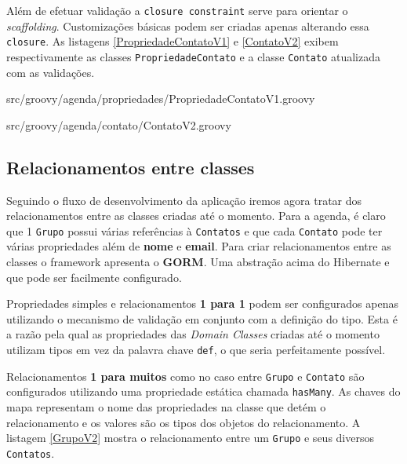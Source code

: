 \documentclass[12pt]{article}
\begin{document}
  Além de efetuar validação a \texttt{closure constraint} serve para orientar o \emph{scaffolding}.
  Customizações básicas podem ser criadas apenas alterando essa \texttt{closure}. As listagens
  \ref{PropriedadeContatoV1} e \ref{ContatoV2} exibem respectivamente as classes
  \texttt{PropriedadeContato} e a classe \texttt{Contato} atualizada com as validações.
  
  
                    {src/groovy/agenda/propriedades/PropriedadeContatoV1.groovy}
                    
  
                  {src/groovy/agenda/contato/ContatoV2.groovy}
    
\subsection{Relacionamentos entre classes}
    
    Seguindo o fluxo de desenvolvimento da aplicação iremos agora tratar dos relacionamentos
    entre as classes criadas até o momento. Para a agenda, é claro que 1 \texttt{Grupo}
    possui várias referências à \texttt{Contatos} e que cada \texttt{Contato} pode
    ter várias propriedades além de \textbf{nome} e \textbf{email}. Para criar 
    relacionamentos entre as classes o framework apresenta o \textbf{GORM}. Uma 
    abstração acima do Hibernate e que pode ser facilmente configurado.
    
    Propriedades simples e relacionamentos \textbf{1 para 1} podem ser configurados
    apenas utilizando o mecanismo de validação em conjunto com a definição do tipo.
    Esta é a razão pela qual as propriedades das \emph{Domain Classes} criadas até o momento
    utilizam tipos em vez da palavra chave \texttt{def}, o que seria perfeitamente
    possível.
    
    Relacionamentos \textbf{1 para muitos} como no caso entre \texttt{Grupo} e \texttt{Contato} são
    configurados utilizando uma propriedade estática chamada \texttt{hasMany}. As chaves
    do mapa representam o nome das propriedades na classe que detém o relacionamento
    e os valores são os tipos dos objetos do relacionamento. A listagem \ref{GrupoV2}
    mostra o relacionamento entre um \texttt{Grupo} e seus diversos \texttt{Contatos}.
    
\end{document}
